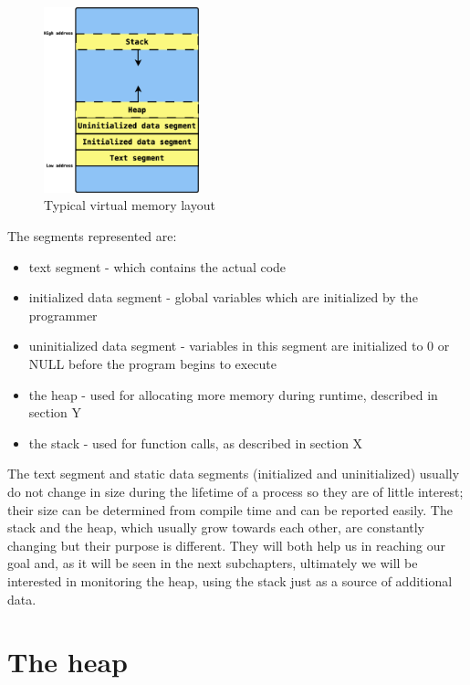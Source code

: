 \begin{figure}[htb]
\centering
\includegraphics[width=0.4\textwidth]{src/img/virtmemlayout}
\caption{Typical virtual memory layout}
\label{fig:virtmemlayout}
\end{figure}

The segments represented are:
\begin{itemize}
\item text segment - which contains the actual code
\item initialized data segment - global variables which are initialized by the programmer
\item uninitialized data segment - variables in this segment are initialized to 0 or NULL before the program begins to execute
\item the heap - used for allocating more memory during runtime, described in section Y
\item the stack - used for function calls, as described in section X
\end{itemize}

The text segment and static data segments (initialized and uninitialized) usually do not change in size during the lifetime of a process so they are of little interest; their size can be determined from compile time and can be reported easily. The stack and the heap, which usually grow towards each other, are constantly changing but their purpose is different. They will both help us in reaching our goal and, as it will be seen in the next subchapters, ultimately we will be interested in monitoring the heap, using the stack just as a source of additional data.

\section{The heap}
\label{section:heap}

